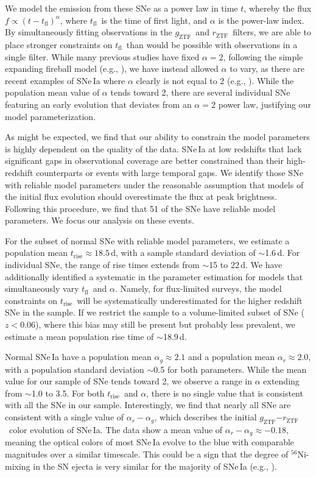 \documentclass[twocolumn]{./aastex63}
\newcommand{\rztf}{$r_\mathrm{ZTF}$}
\newcommand{\gztf}{$g_\mathrm{ZTF}$}
\newcommand{\tfl}{$t_\mathrm{fl}$}
\newcommand{\trise}{$t_\mathrm{rise}$}
\begin{document}
We model the emission from these SNe as a power law in time $t$, whereby the
flux $f \propto (t - t_\mathrm{fl})^\alpha$, where \tfl\ is the time of first
light, and $\alpha$ is the power-law index. By simultaneously fitting
observations in the \gztf\ and \rztf\ filters, we are able to place stronger
constraints on \tfl\ than would be possible with observations in a single
filter. While many previous studies have fixed $\alpha = 2$, following the
simple expanding fireball model (e.g., \citealt{Riess99a}), we have instead
allowed $\alpha$ to vary, as there are recent examples of SNe\,Ia where
$\alpha$ clearly is not equal to 2 (e.g.,
\citealt{Zheng13,Zheng14,Goobar15,Miller18,Shappee19,Dimitriadis19}). While
the population mean value of $\alpha$ tends toward 2, there are several
individual SNe featuring an early evolution that deviates from an $\alpha = 2$
power law, justifying our model parameterization.

As might be expected, we find that our ability to constrain the model
parameters is highly dependent on the quality of the data. SNe\,Ia at low
redshifts that lack significant gaps in observational coverage are better
constrained than their high-redshift counterparts or events with large
temporal gaps. We identify those SNe with reliable model parameters under the
reasonable assumption that models of the initial flux evolution should
overestimate the flux at peak brightness. Following this procedure, we find
that 51 of the SNe have reliable model parameters. We focus our analysis on
these events.

For the subset of normal SNe with reliable model parameters, we estimate a
population mean \trise\;$\approx 18.5$\,d, with a sample standard deviation of
$\sim$1.6\,d. For individual SNe, the range of rise times extends from
$\sim$15 to 22\,d. We have additionally identified a systematic in the
parameter estimation for models that simultaneously vary \tfl\ and $\alpha$.
Namely, for flux-limited surveys, the model constraints on \trise\ will be
systematically underestimated for the higher redshift SNe in the sample. If we
restrict the sample to a volume-limited subset of SNe ($z < 0.06$), where this
bias may still be present but probably less prevalent, we estimate a mean
population rise time of $\sim$18.9\,d.

Normal SNe\,Ia have a population mean $\alpha_g \approx 2.1$ and a population
mean $\alpha_r \approx 2.0$, with a population standard deviation $\sim$0.5
for both parameters. While the mean value for our sample of SNe tends toward
2, we observe a range in $\alpha$ extending from $\sim$1.0 to 3.5. For both
\trise\ and $\alpha$, there is no single value that is consistent with all the
SNe in our sample. Interestingly, we find that nearly all SNe are consistent
with a single value of $\alpha_r - \alpha_g$, which describes the initial
\gztf$ - $\rztf\ color evolution of SNe\,Ia. The data show a mean value of
$\alpha_r - \alpha_g \approx -0.18$, meaning the optical colors of most
SNe\,Ia evolve to the blue with comparable magnitudes over a similar
timescale. This could be a sign that the degree of $^{56}$Ni-mixing in the SN
ejecta is very similar for the majority of SNe\,Ia (e.g.,
\citealt{Piro16,Magee18,Magee20}).
\end{document}
